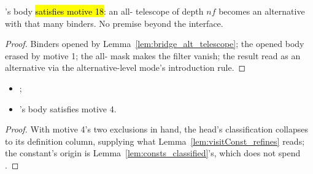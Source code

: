 \begin{lemma}
\label{lem:step_visitAlt}
\leanok
{}
 's body \hl{satisfies motive 18}: an all- telescope of depth
$nf$ becomes an alternative with that many binders. No premise beyond the interface.
\end{lemma}
\begin{proof}
\leanok
{}
 Binders opened by Lemma~\ref{lem:bridge_alt_telescope}; the opened body erased by motive 1;
the all- mask makes the filter vanish; the result read as an alternative via the
alternative-level mode's introduction rule.
\end{proof}

\begin{lemma}
\label{lem:step_visitConst}
\leanok
{}
\begin{itemize}
\item {} ;
\item {} 's body satisfies motive 4.
\end{itemize}
\end{lemma}
\begin{proof}
\leanok
{}
 With motive 4's two exclusions in hand, the head's classification collapses to its
definition column, supplying what Lemma~\ref{lem:visitConst_refines} reads; the constant's origin is
Lemma~\ref{lem:consts_classified}'s, which does not spend .
\end{proof}

